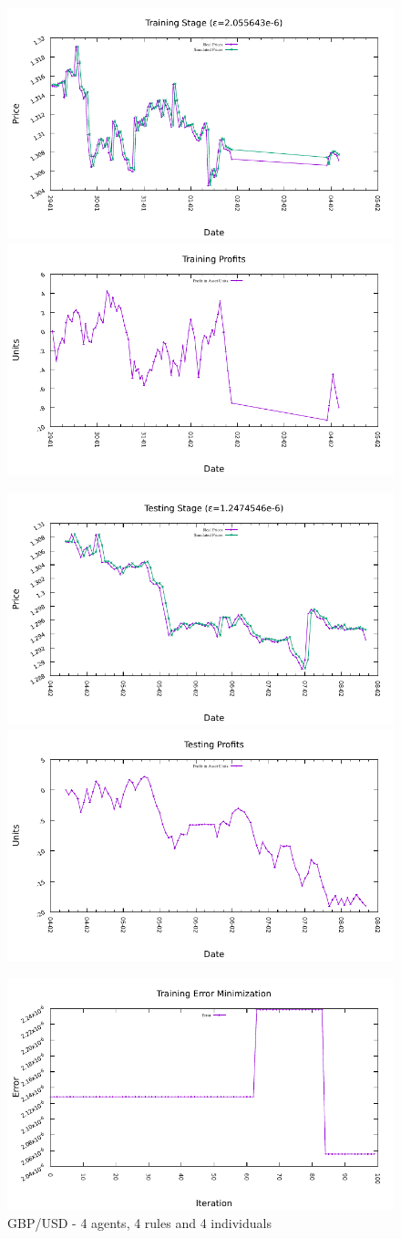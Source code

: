 \begin{figure}[htp]
  \centering

  \includegraphics[width=.45\textwidth]{img/plots/gbp_usd_h1-4agents-4rules-4ind-100gen_training_fit.pdf}\quad
  \includegraphics[width=.45\textwidth]{img/plots/gbp_usd_h1-4agents-4rules-4ind-100gen_training_profits.pdf}

  \medskip

  \includegraphics[width=.45\textwidth]{img/plots/gbp_usd_h1-4agents-4rules-4ind-100gen_testing_fit.pdf}\quad
  \includegraphics[width=.45\textwidth]{img/plots/gbp_usd_h1-4agents-4rules-4ind-100gen_testing_profits.pdf}

  \medskip

  \includegraphics[width=.45\textwidth]{img/plots/gbp_usd_h1-4agents-4rules-4ind-100gen_error_minimization.pdf}

  \caption{GBP/USD - 4 agents, 4 rules and 4 individuals}
  \label{figure:gbp-usd-4agents-4rules-4individuals}
\end{figure}

